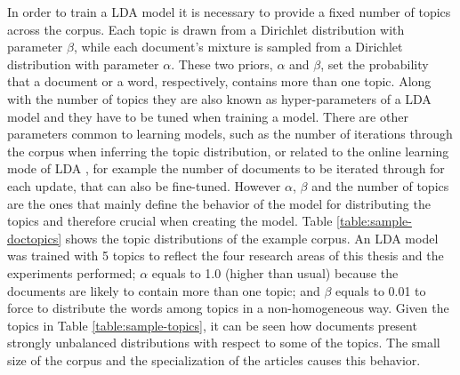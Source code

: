 In order to train a LDA model it is necessary to provide a fixed number of topics across the corpus. Each topic is drawn from a Dirichlet distribution with parameter $\beta$, while each document's mixture is sampled from a Dirichlet distribution with parameter $\alpha$. These two priors, $\alpha$ and $\beta$, set the probability that a document or a word, respectively, contains more than one topic. Along with the number of topics they are also known as hyper-parameters of a LDA model and they have to be tuned when training a model. There are other parameters common to learning models, such as the number of iterations through the corpus when inferring the topic distribution, or related to the online learning mode of LDA \citep{Blei2010}, for example the number of documents to be iterated through for each update, that can also be fine-tuned. However $\alpha$, $\beta$ and the number of topics are the ones that mainly define the behavior of the model for distributing the topics and therefore crucial when creating the model. Table \ref{table:sample-doctopics} shows the topic distributions of the example corpus. An LDA model was trained with 5 topics to reflect the four research areas of this thesis and the experiments performed;  $\alpha$ equals to 1.0 (higher than usual) because the documents are likely to contain more than one topic; and $\beta$ equals to 0.01 to force to distribute the words among topics in a non-homogeneous way. Given the topics in Table \ref{table:sample-topics}, it can be seen how documents present strongly unbalanced distributions with respect to some of the topics. The small size of the corpus and the specialization of the articles causes this behavior.

